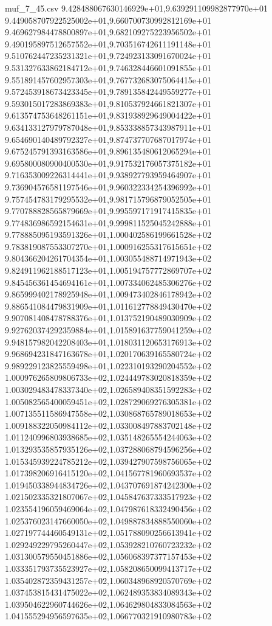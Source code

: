 \begin{filecontents*}{muf_7_45.csv}
9.428488067630146929e+01,9.639291109982877970e+01
9.449058707922525002e+01,9.660700730992812169e+01
9.469627984478800897e+01,9.682109275223956502e+01
9.490195897512657552e+01,9.703516742611191148e+01
9.510762447235231321e+01,9.724923133091670024e+01
9.531327633862184712e+01,9.746328446601091855e+01
9.551891457602957303e+01,9.767732683075064415e+01
9.572453918673423345e+01,9.789135842449559277e+01
9.593015017283869383e+01,9.810537924661821307e+01
9.613574753648261151e+01,9.831938929649004422e+01
9.634133127979787048e+01,9.853338857343987911e+01
9.654690140489792327e+01,9.874737707687017974e+01
9.675245791393163586e+01,9.896135480612065294e+01
9.695800080900400530e+01,9.917532176057375182e+01
9.716353009226314441e+01,9.938927793959464907e+01
9.736904576581197546e+01,9.960322334254396992e+01
9.757454783179295532e+01,9.981715796879052505e+01
9.770788828565879669e+01,9.995597171917415835e+01
9.774836986592154631e+01,9.999811525045242888e+01
9.778885095193591326e+01,1.000402586199661528e+02
9.783819087553307270e+01,1.000916255317615651e+02
9.804366204261704354e+01,1.003055488714971943e+02
9.824911962188517123e+01,1.005194757772869707e+02
9.845456361454694161e+01,1.007334062485306276e+02
9.865999402178925948e+01,1.009473402846178942e+02
9.886541084479831909e+01,1.011612778849430470e+02
9.907081408478788376e+01,1.013752190489030909e+02
9.927620374292359884e+01,1.015891637759041259e+02
9.948157982042208403e+01,1.018031120653176913e+02
9.968694231847163678e+01,1.020170639165580724e+02
9.989229123825559498e+01,1.022310193290204552e+02
1.000976265809806733e+02,1.024449783020818359e+02
1.003029483478337340e+02,1.026589408351592283e+02
1.005082565400059451e+02,1.028729069276305381e+02
1.007135511586947558e+02,1.030868765789018653e+02
1.009188322050984112e+02,1.033008497883702148e+02
1.011240996803938685e+02,1.035148265554244063e+02
1.013293535857935126e+02,1.037288068794596256e+02
1.015345939224785212e+02,1.039427907598756065e+02
1.017398206916415120e+02,1.041567781960693537e+02
1.019450338944834726e+02,1.043707691874242300e+02
1.021502335321807067e+02,1.045847637333517923e+02
1.023554196059469064e+02,1.047987618332490456e+02
1.025376023147660050e+02,1.049887834888550060e+02
1.027197744460549131e+02,1.051788090256613941e+02
1.029249229795260447e+02,1.053928210760723232e+02
1.031300579550451886e+02,1.056068397377157453e+02
1.033351793735523927e+02,1.058208650099413717e+02
1.035402872359431257e+02,1.060348968920570769e+02
1.037453815431475022e+02,1.062489353834089343e+02
1.039504622960744626e+02,1.064629804833084563e+02
1.041555294956597635e+02,1.066770321910980783e+02

\end{filecontents*}
